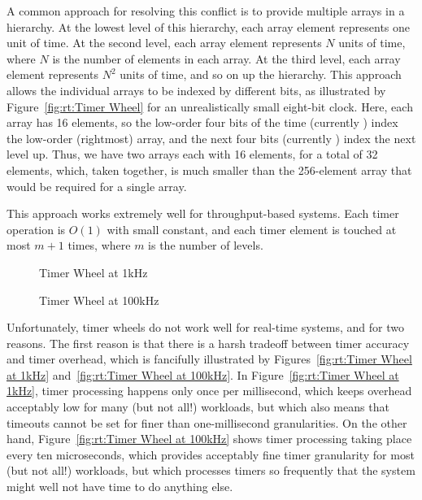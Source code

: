 A common approach for resolving this conflict is to provide multiple
arrays in a hierarchy.
At the lowest level of this hierarchy, each array element represents
one unit of time.
At the second level, each array element represents $N$ units of time,
where $N$ is the number of elements in each array.
At the third level, each array element represents $N^2$ units of time,
and so on up the hierarchy.
This approach allows the individual arrays to be indexed by different
bits, as illustrated by
Figure~\ref{fig:rt:Timer Wheel}
for an unrealistically small eight-bit clock.
Here, each array has 16 elements, so the low-order four bits of the time
(currently ) index the low-order (rightmost) array, and the
next four bits (currently ) index the next level up.
Thus, we have two arrays each with 16 elements, for a total of 32 elements,
which, taken together, is much smaller than the 256-element array that
would be required for a single array.

This approach works extremely well for throughput-based systems.
Each timer operation is $O(1)$ with small constant, and each timer
element is touched at most $m+1$ times, where $m$ is the number of
levels.

\begin{figure}[tb]
\centering
{}
\caption{Timer Wheel at 1kHz}
\end{figure}

\begin{figure}[tb]
\centering
{}
\caption{Timer Wheel at 100kHz}
\end{figure}

Unfortunately, timer wheels do not work well for real-time systems, and for
two reasons.
The first reason is that there is a harsh tradeoff between timer
accuracy and timer overhead, which is fancifully illustrated by
Figures~\ref{fig:rt:Timer Wheel at 1kHz}
and~\ref{fig:rt:Timer Wheel at 100kHz}.
In
Figure~\ref{fig:rt:Timer Wheel at 1kHz},
timer processing happens only once per millisecond, which keeps overhead
acceptably low for many (but not all!) workloads, but which also means
that timeouts cannot be set for finer than one-millisecond granularities.
On the other hand,
Figure~\ref{fig:rt:Timer Wheel at 100kHz}
shows timer processing taking place every ten microseconds, which
provides acceptably fine timer granularity for most (but not all!)
workloads, but which processes timers so frequently that the system
might well not have time to do anything else.


